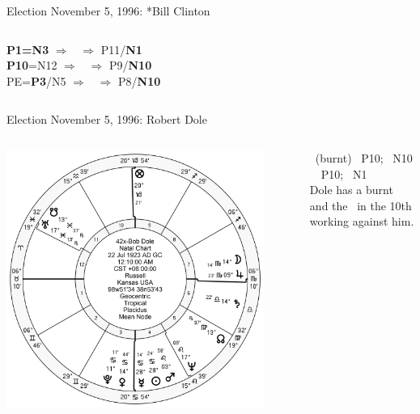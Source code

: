 \begin{frame}[t]{Election November 5, 1996: *Bill Clinton}
\begin{columns}[T, onlytextwidth]
\textbf{\dgreen P1=N3}
	$\Rightarrow$ \Jupiter\, $\Rightarrow$ P11/\textbf{\dgreen N1}\\
\textbf{\red P10}=N12
	$\Rightarrow$ \Mercury\, $\Rightarrow$ P9/\textbf{\red N10}\\
PE=\textbf{\dgreen P3}/N5
	 $\Rightarrow$ \Saturn\, $\Rightarrow$ P8/\textbf{\red N10}

\end{columns}
\end{frame}

\begin{frame}[t]{Election November 5, 1996: Robert Dole}
\small
\begin{columns}[T, onlytextwidth]
\vspace{-1em}
{\includegraphics[width=0.9\textwidth]{charts/Dole.png}}

\Mercury\, (burnt) \Trine\, P10; \Opposition\, N10 \\
\Jupiter\, \Trine\, P10; \Opposition\, N1 \\
\vspace{0.5em}
Dole has a burnt \Mercury\, and the \SouthNode\, in the 10th working against him.



\end{columns}
\end{frame}
